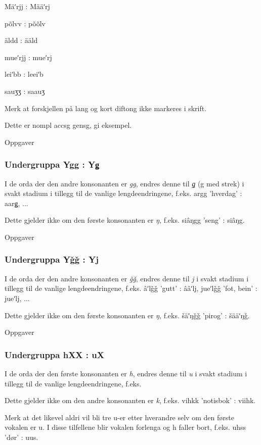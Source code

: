 Mäʹrjj : Määʹrj

põlvv : põõlv

äldd : ääld

mueʹrjj : mueʹrj

leiʹbb : leeiʹb

sauʒʒ : saauʒ

Merk at forskjellen på lang og kort diftong ikke markeres i skrift.

Dette er nompl accsg gensg, gi eksempel.

Oppgaver

\subsubsection{Undergruppa Ygg : Yǥ}

I de orda der den andre konsonanten er \emph{gg}, endres denne til \emph{ǥ} (g med strek) i svakt stadium i tillegg til de vanlige lengdeendringene, f.eks. argg 'hverdag' : aarǥ, ...

Dette gjelder ikke om den første konsonanten er \emph{ŋ}, f.eks. siâŋgg 'seng' : siâŋg.

Oppgaver

\subsubsection{Undergruppa Yǧǧ : Yj}

I de orda der den andre konsonanten er \emph{ǧǧ}, endres denne til \emph{j} i svakt stadium i tillegg til de vanlige lengdeendringene, f.eks.  âʹlǧǧ 'gutt' : ââʹlj, jueʹlǧǧ 'fot, bein' : jueʹlj, ...

Dette gjelder ikke om den første konsonanten er \emph{ŋ}, f.eks. šäʹŋǧǧ 'pirog' : šääʹŋǧ.

Oppgaver

\subsubsection{Undergruppa hXX : uX}

I de orda der den første konsonanten er \emph{h}, endres denne til \emph{u} i svakt stadium i tillegg til de vanlige lengdeendringene, f.eks.  

Dette gjelder ikke om den andre konsonanten er \emph{k}, f.eks. vihkk 'notisbok' : viihk.

Merk at det likevel aldri vil bli tre u-er etter hverandre selv om den første vokalen er u. I disse tilfellene blir vokalen forlenga og h faller bort, f.eks. uhss 'dør' : uus.

